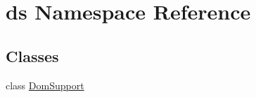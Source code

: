 \hypertarget{namespaceds}{}\section{ds Namespace Reference}
\label{namespaceds}
\subsection*{Classes}
\begin{DoxyCompactItemize}
\item 
class \hyperlink{classds_1_1DomSupport}{Dom\+Support}
\end{DoxyCompactItemize}
